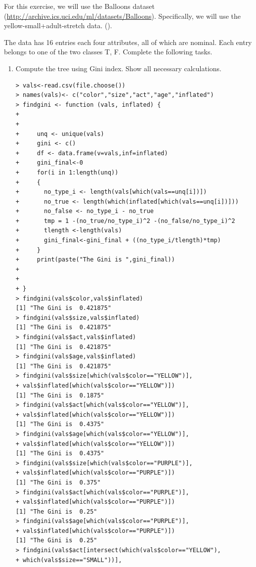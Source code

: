\documentclass[fontsize=10pt]{scrartcl}
\begin{document}
		\begin{sloppypar}
		For this exercise, we will use the Balloons dataset (\url{http://archive.ics.uci.edu/ml/datasets/Balloons}). Specifically, we will use the yellow-small+adult-stretch data. ().
		\end{sloppypar}
		The data has 16 entries each four attributes, all of which are nominal. Each entry belongs to one of the two classes {T, F}. Complete the following tasks.

		\begin{enumerate}
			\item
			Compute the tree using Gini index. Show all necessary calculations.

\begin{verbatim}
> vals<-read.csv(file.choose())
> names(vals)<- c("color","size","act","age","inflated")
> findgini <- function (vals, inflated) {
+   
+   
+     unq <- unique(vals)
+     gini <- c()
+     df <- data.frame(v=vals,inf=inflated)
+     gini_final<-0
+     for(i in 1:length(unq))
+     {
+       no_type_i <- length(vals[which(vals==unq[i])])
+       no_true <- length(which(inflated[which(vals==unq[i])]))
+       no_false <- no_type_i - no_true
+       tmp = 1 -(no_true/no_type_i)^2 -(no_false/no_type_i)^2
+       tlength <-length(vals)
+       gini_final<-gini_final + ((no_type_i/tlength)*tmp)
+     }
+     print(paste("The Gini is ",gini_final))
+   
+ 
+ }
> findgini(vals$color,vals$inflated)
[1] "The Gini is  0.421875"
> findgini(vals$size,vals$inflated)
[1] "The Gini is  0.421875"
> findgini(vals$act,vals$inflated)
[1] "The Gini is  0.421875"
> findgini(vals$age,vals$inflated)
[1] "The Gini is  0.421875"
> findgini(vals$size[which(vals$color=="YELLOW")],
+ vals$inflated[which(vals$color=="YELLOW")])
[1] "The Gini is  0.1875"
> findgini(vals$act[which(vals$color=="YELLOW")],
+ vals$inflated[which(vals$color=="YELLOW")])
[1] "The Gini is  0.4375"
> findgini(vals$age[which(vals$color=="YELLOW")],
+ vals$inflated[which(vals$color=="YELLOW")])
[1] "The Gini is  0.4375"
> findgini(vals$size[which(vals$color=="PURPLE")],
+ vals$inflated[which(vals$color=="PURPLE")])
[1] "The Gini is  0.375"
> findgini(vals$act[which(vals$color=="PURPLE")],
+ vals$inflated[which(vals$color=="PURPLE")])
[1] "The Gini is  0.25"
> findgini(vals$age[which(vals$color=="PURPLE")],
+ vals$inflated[which(vals$color=="PURPLE")])
[1] "The Gini is  0.25"
> findgini(vals$act[intersect(which(vals$color=="YELLOW"),
+ which(vals$size=="SMALL"))],

\end{verbatim}
\end{enumerate}
\end{document}
